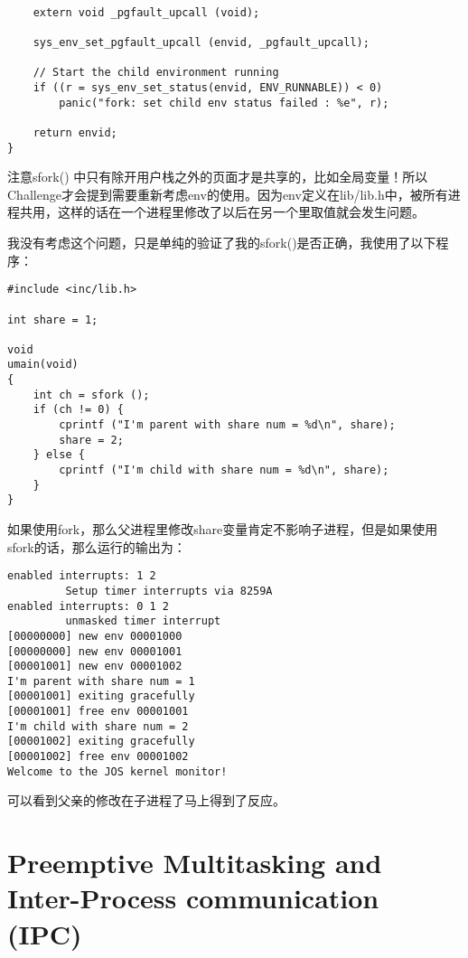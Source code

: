 \documentclass{article}
\newcommand{\funcname}[1]{{\ttfamily \small #1}}
\begin{document}
\begin{CJK*}{UTF8}{gkai}
\begin{lstlisting}[style=ccode, title={\scriptsize \ttfamily \bfseries lib/fork.c: sfork()}]
    
    extern void _pgfault_upcall (void);

    sys_env_set_pgfault_upcall (envid, _pgfault_upcall);

    // Start the child environment running
    if ((r = sys_env_set_status(envid, ENV_RUNNABLE)) < 0)
        panic("fork: set child env status failed : %e", r);

    return envid;
}
\end{lstlisting}
 
\vspace{1em}

注意\funcname{sfork()} 中只有除开用户栈之外的页面才是共享的，比如全局变量！所以Challenge才会提到需要重新考虑env的使用。因为env定义在lib/lib.h中，被所有进程共用，这样的话在一个进程里修改了以后在另一个里取值就会发生问题。

我没有考虑这个问题，只是单纯的验证了我的\funcname{sfork()}是否正确，我使用了以下程序：

\begin{lstlisting}[style=ccode, title={\scriptsize \ttfamily \bfseries user/sfork.c}]
#include <inc/lib.h>

int share = 1;

void
umain(void)
{
    int ch = sfork ();
    if (ch != 0) {
        cprintf ("I'm parent with share num = %d\n", share);
        share = 2;
    } else {
        cprintf ("I'm child with share num = %d\n", share);
    }
}
\end{lstlisting}

如果使用fork，那么父进程里修改share变量肯定不影响子进程，但是如果使用sfork的话，那么运行的输出为：

\begin{lstlisting}[style=console]
enabled interrupts: 1 2
	     Setup timer interrupts via 8259A
enabled interrupts: 0 1 2
	     unmasked timer interrupt
[00000000] new env 00001000
[00000000] new env 00001001
[00001001] new env 00001002
I'm parent with share num = 1
[00001001] exiting gracefully
[00001001] free env 00001001
I'm child with share num = 2
[00001002] exiting gracefully
[00001002] free env 00001002
Welcome to the JOS kernel monitor!
\end{lstlisting}

可以看到父亲的修改在子进程了马上得到了反应。



\section{Preemptive Multitasking and Inter-Process communication (IPC)}


\end{CJK*}
\end{document}
